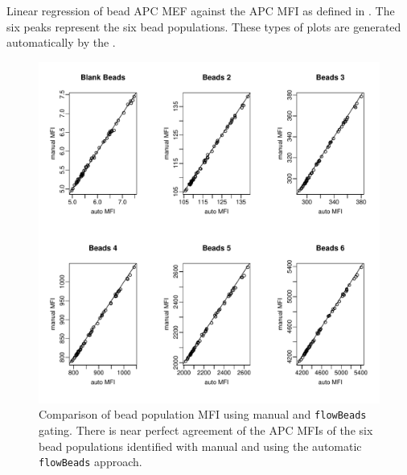 { Linear regression of bead APC MEF against the APC MFI as defined in .}
{
The six peaks represent the six bead populations.
These types of plots are generated automatically by the .
}


\begin{figure}[hb]
\centering
\includegraphics[scale=0.6]{figures/manual-auto-mfi.pdf}
{ Comparison of bead population MFI using manual and \texttt{flowBeads} gating.  }
{ There is near perfect agreement of the APC MFIs of the six bead populations identified with manual and using the automatic \texttt{flowBeads} approach. }
\end{figure}



